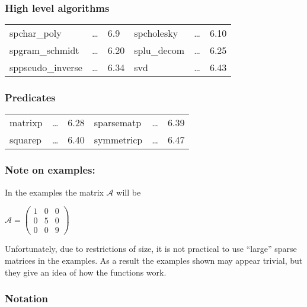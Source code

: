 \subsubsection{High level algorithms}

\begin{center}
\begin{tabular}{l l l l l l}
spchar\_poly       & \ldots & 6.9 & 
spcholesky         & \ldots & 6.10 \\ 
spgram\_schmidt    & \ldots & 6.20 & 
splu\_decom        & \ldots & 6.25 \\
sppseudo\_inverse  & \ldots & 6.34 & 
svd                & \ldots & 6.43 
\end{tabular}
\end{center}

\subsubsection{Predicates}

\begin{center}
\begin{tabular}{l l l l l l}
matrixp     & \ldots & 6.28 & 
sparsematp  & \ldots & 6.39 \\
squarep     & \ldots & 6.40 &
symmetricp  & \ldots & 6.47 
\end{tabular}
\end{center}

\subsubsection*{Note on examples:} 

In the examples the matrix $\mathcal{A}$ will be 

\begin{flushleft}
\begin{math}
\mathcal{A} = \left( \begin{array}{ccc} 1 & 0 & 0 \\ 0 & 5 & 0 \\ 0 & 0 & 9
\end{array} \right)
\end{math}
\end{flushleft}
Unfortunately, due to restrictions of size, it is not practical to use
``large'' sparse matrices in the examples. As a result the examples 
shown may appear trivial, but they give an idea of how the functions 
work.  

\subsubsection*{Notation}

